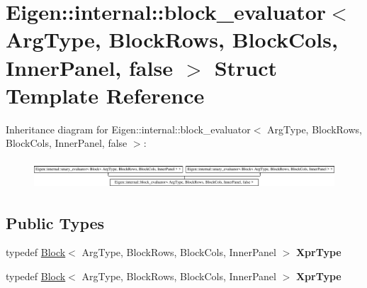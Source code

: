 \hypertarget{struct_eigen_1_1internal_1_1block__evaluator_3_01_arg_type_00_01_block_rows_00_01_block_cols_00_01_inner_panel_00_01false_01_4}{}\section{Eigen\+:\+:internal\+:\+:block\+\_\+evaluator$<$ Arg\+Type, Block\+Rows, Block\+Cols, Inner\+Panel, false $>$ Struct Template Reference}
\label{struct_eigen_1_1internal_1_1block__evaluator_3_01_arg_type_00_01_block_rows_00_01_block_cols_00_01_inner_panel_00_01false_01_4}
Inheritance diagram for Eigen\+:\+:internal\+:\+:block\+\_\+evaluator$<$ Arg\+Type, Block\+Rows, Block\+Cols, Inner\+Panel, false $>$\+:\begin{figure}[H]
\begin{center}
\leavevmode
\includegraphics[height=1.052632cm]{struct_eigen_1_1internal_1_1block__evaluator_3_01_arg_type_00_01_block_rows_00_01_block_cols_00_01_inner_panel_00_01false_01_4}
\end{center}
\end{figure}
\subsection*{Public Types}
\begin{DoxyCompactItemize}
\item 
\mbox{\label{struct_eigen_1_1internal_1_1block__evaluator_3_01_arg_type_00_01_block_rows_00_01_block_cols_00_01_inner_panel_00_01false_01_4_aace900a8b95db4b5bb32d001ed47046d}} 
typedef \hyperlink{group___core___module_class_eigen_1_1_block}{Block}$<$ Arg\+Type, Block\+Rows, Block\+Cols, Inner\+Panel $>$ {\bfseries Xpr\+Type}
\item 
\mbox{\label{struct_eigen_1_1internal_1_1block__evaluator_3_01_arg_type_00_01_block_rows_00_01_block_cols_00_01_inner_panel_00_01false_01_4_aace900a8b95db4b5bb32d001ed47046d}} 
typedef \hyperlink{group___core___module_class_eigen_1_1_block}{Block}$<$ Arg\+Type, Block\+Rows, Block\+Cols, Inner\+Panel $>$ {\bfseries Xpr\+Type}
\end{DoxyCompactItemize}
